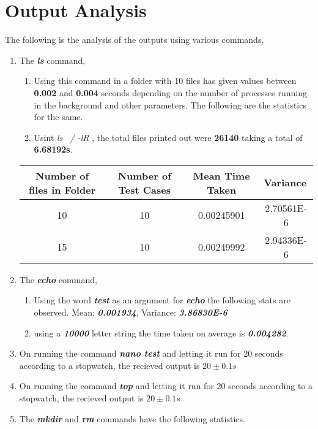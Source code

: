 \documentclass[a4paper,12pt]{report}
\begin{document}
\section*{Output Analysis}
The following is the analysis of the outputs using various commands,
\begin{enumerate}
\item The \textbf{\textit{ls}} command,
\begin{enumerate}
\item Using this command in a folder with 10 files has given values between \textbf{0.002} and \textbf{0.004} seconds depending on the number of processes running in the background and other parameters. The following are the statistics for the same.\\
\item Usint \textit{ls ~/ -lR} , the total files printed out were \textbf{26140} taking a total of \textbf{6.68192s}.\\
\end{enumerate}
\begin{tabular}{|c|c|c|c|}
\hline
Number of files in Folder & Number of Test Cases       & Mean Time Taken                    & \multicolumn{1}{l|}{Variance} \\ \hline
10                        & \cellcolor[HTML]{FFFFFF}10 & \cellcolor[HTML]{FFFFFF}0.00245901 & 2.70561E-6                    \\ \hline
15                        & \cellcolor[HTML]{FFFFFF}10 & \cellcolor[HTML]{FFFFFF}0.00249992 & 2.94336E-6                    \\ \hline
\end{tabular}
\item The \textbf{\textit{echo}} command,
\begin{enumerate}
\item Using the word \textbf{\textit{test}} as an argument for \textbf{\textit{echo}} the following stats are observed.
Mean: \textbf{\textit{0.001934}}, Variance: \textbf{\textit{3.86830E-6}}
\item using a \textbf{\textit{10000}} letter string the time taken on average is \textbf{\textit{0.004282}}.
\end{enumerate}
\item On running the command \textbf{\textit{nano test}} and letting it run for 20 seconds according to a stopwatch, the recieved output is $20 \pm 0.1s$
\item On running the command \textbf{\textit{top}} and letting it run for 20 seconds according to a stopwatch, the recieved output is $20 \pm 0.1s$
\item The \textbf{\textit{mkdir}} and \textbf{\textit{rm}} commands have the following statistics.
\end{enumerate}
\end{document}
